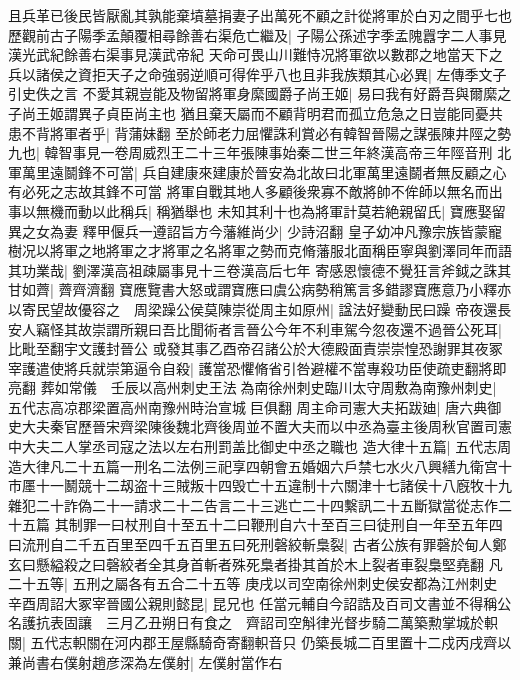 且兵革已後民皆厭亂其孰能棄墳墓捐妻子出萬死不顧之計從將軍於白刃之間乎七也歷觀前古子陽季孟顛覆相尋餘善右渠危亡繼及|{
	子陽公孫述字季孟隗囂字二人事見漢光武紀餘善右渠事見漢武帝紀}
天命可畏山川難恃况將軍欲以數郡之地當天下之兵以諸侯之資拒天子之命強弱逆順可得侔乎八也且非我族類其心必異|{
	左傳季文子引史佚之言}
不愛其親豈能及物留將軍身縻國爵子尚王姬|{
	易曰我有好爵吾與爾縻之子尚王姬謂異子貞臣尚主也}
猶且棄天屬而不顧背明君而孤立危急之日豈能同憂共患不背將軍者乎|{
	背蒲妹翻}
至於師老力屈懼誅利賞必有韓智晉陽之謀張陳井陘之勢九也|{
	韓智事見一卷周威烈王二十三年張陳事始秦二世三年終漢高帝三年陘音刑}
北軍萬里遠鬬鋒不可當|{
	兵自建康來建康於晉安為北故曰北軍萬里遠鬬者無反顧之心有必死之志故其鋒不可當}
將軍自戰其地人多顧後衆寡不敵將帥不侔師以無名而出事以無機而動以此稱兵|{
	稱猶舉也}
未知其利十也為將軍計莫若絶親留氏|{
	寶應娶留異之女為妻}
釋甲偃兵一遵詔旨方今藩維尚少|{
	少詩沼翻}
皇子幼冲凡豫宗族皆蒙寵樹况以將軍之地將軍之才將軍之名將軍之勢而克脩藩服北面稱臣寧與劉澤同年而語其功業哉|{
	劉澤漢高祖疎屬事見十三卷漢高后七年}
寄感恩懷德不覺狂言斧鉞之誅其甘如薺|{
	薺齊濟翻}
寶應覽書大怒或謂寶應曰虞公病勢稍篤言多錯謬寶應意乃小釋亦以寄民望故優容之　周梁躁公侯莫陳崇從周主如原州|{
	諡法好變動民曰躁}
帝夜還長安人竊怪其故崇謂所親曰吾比聞術者言晉公今年不利車駕今忽夜還不過晉公死耳|{
	比毗至翻宇文護封晉公}
或發其事乙酉帝召諸公於大德殿面責崇崇惶恐謝罪其夜冢宰護遣使將兵就崇第逼令自殺|{
	護當恐懼脩省引咎避權不當專殺功臣使疏吏翻將即亮翻}
葬如常儀　壬辰以高州刺史王法為南徐州刺史臨川太守周敷為南豫州刺史|{
	五代志高凉郡梁置高州南豫州時治宣城巨俱翻}
周主命司憲大夫拓跋廸|{
	唐六典御史大夫秦官歷晉宋齊梁陳後魏北齊後周並不置大夫而以中丞為臺主後周秋官置司憲中大夫二人掌丞司寇之法以左右刑罰盖比御史中丞之職也}
造大律十五篇|{
	五代志周造大律凡二十五篇一刑名二法例三祀享四朝會五婚姻六戶禁七水火八興繕九衛宫十市㕓十一鬭競十二刼盗十三賊叛十四毁亡十五違制十六關津十七諸侯十八廐牧十九雜犯二十詐偽二十一請求二十二告言二十三逃亡二十四繫訊二十五斷獄當從志作二十五篇}
其制罪一曰杖刑自十至五十二曰鞭刑自六十至百三曰徒刑自一年至五年四曰流刑自二千五百里至四千五百里五曰死刑磬絞斬梟裂|{
	古者公族有罪磬於甸人鄭玄曰懸縊殺之曰磬絞者全其身首斬者殊死梟者掛其首於木上裂者車裂梟堅堯翻}
凡二十五等|{
	五刑之屬各有五合二十五等}
庚戌以司空南徐州刺史侯安都為江州刺史　辛酉周詔大冢宰晉國公親則懿昆|{
	昆兄也}
任當元輔自今詔誥及百司文書並不得稱公名護抗表固讓　三月乙丑朔日有食之　齊詔司空斛律光督步騎二萬築勲掌城於軹關|{
	五代志軹關在河内郡王屋縣騎奇寄翻軹音只}
仍築長城二百里置十二戍丙戌齊以兼尚書右僕射趙彦深為左僕射|{
	左僕射當作右}


